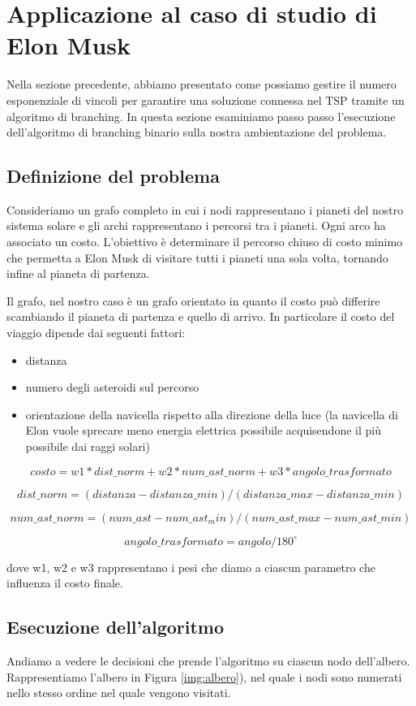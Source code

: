 \section{Applicazione al caso di studio di Elon Musk}
Nella sezione precedente, abbiamo presentato come possiamo gestire il numero esponenziale di vincoli per garantire una soluzione connessa nel TSP tramite un algoritmo di branching. In questa sezione esaminiamo passo passo l’esecuzione dell'algoritmo di branching binario sulla nostra ambientazione del problema.

\subsection{Definizione del problema}

Consideriamo un grafo completo in cui i nodi rappresentano i pianeti del nostro sistema solare e gli archi rappresentano i percorsi tra i pianeti. Ogni arco ha associato un costo. L'obiettivo è determinare il percorso chiuso di costo minimo che permetta a Elon Musk di visitare tutti i pianeti una sola volta, tornando infine al pianeta di partenza.

Il grafo, nel nostro caso è un grafo orientato in quanto il costo può differire scambiando il pianeta di partenza e quello di arrivo. In particolare il costo del viaggio dipende dai seguenti fattori:

\begin{itemize}
    \item distanza
    \item numero degli asteroidi sul percorso
    \item orientazione della navicella rispetto alla direzione della luce (la navicella di Elon vuole sprecare meno energia elettrica possibile acquisendone il più possibile dai raggi solari)
\end{itemize}

\[
costo = w1 * dist\_norm + w2 * num\_ast\_norm + w3 * angolo\_trasformato 
\]

\[
dist\_norm = (distanza - distanza\_min) / (distanza\_max - distanza\_min)
\]

\[
num\_ast\_norm = (num\_ast - num\_ast_min) / (num\_ast\_max - num\_ast\_min)
\]

\[
angolo\_trasformato = angolo / 180^{\circ}
\]

dove w1, w2 e w3 rappresentano i pesi che diamo a ciascun parametro che influenza il costo finale.


\subsection{Esecuzione dell'algoritmo}
Andiamo a vedere le decisioni che prende l'algoritmo su ciascun nodo dell'albero. Rappresentiamo l'albero in Figura \ref{img:albero}), nel quale i nodi sono numerati nello stesso ordine nel quale vengono visitati.

